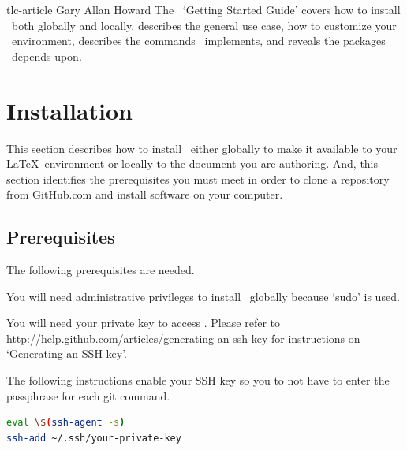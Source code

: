 \documentclass[12pt]{tlc-article}
\begin{document}

\tlcTitlePageAndTableOfContents
  {tlc-article}
  {Gary Allan Howard}
  {The \tlcA\ `Getting Started Guide' covers how to install \tlcA\ both globally
   and locally, describes the general use case, how to customize your \tlcA\
   environment, describes the commands \tlcA\ implements, and reveals the
   packages \tlcA\ depends upon.}


\section{Installation}
This section describes how to install \tlcA\ either globally to make it
available to your \LaTeX\ environment or locally to the document you are
authoring.  And, this section identifies the prerequisites you must meet in
order to clone a repository from GitHub.com and install software on your
computer.


\subsection{Prerequisites}
The following prerequisites are needed.
\begin{description}[style=nextline]
  \item[Administrative privilege] You will need administrative privileges to
    install \tlcA\ globally because `sudo' is used.

  \item[SSH key] You will need your private key to access \gitHub.  Please refer
    to \url{http://help.github.com/articles/generating-an-ssh-key} for
    instructions on `Generating an SSH key'.

  \item[Enable your SSH key] The following instructions enable your SSH key so
    you to not have to enter the passphrase for each git command.
\end{description}

\begin{lstlisting}[language=bash]
eval \$(ssh-agent -s)
ssh-add ~/.ssh/your-private-key
\end{lstlisting}
\end{document}
